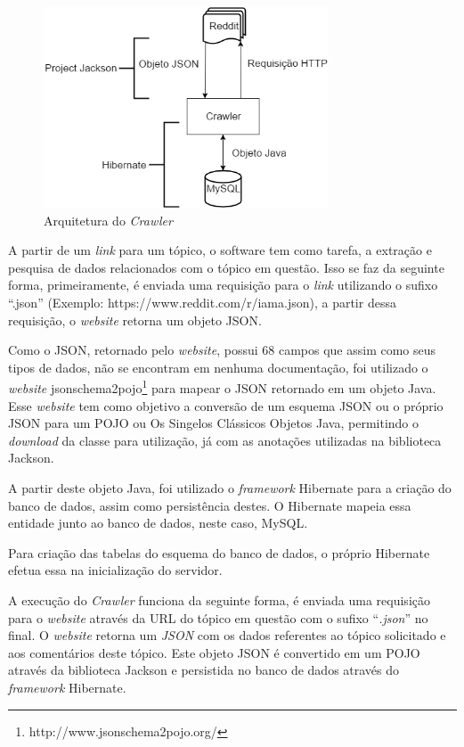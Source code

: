 \begin{figure}[htbp]
\centering
\includegraphics[height=225px]{imagens/arquitetura.png}
\caption{Arquitetura do \textit{Crawler}}
\label{fig:crawler}
\end{figure}

A partir de um \textit{link} para um tópico, o software tem como tarefa, a
extração e pesquisa de dados relacionados com o tópico em questão. Isso se faz
da seguinte forma, primeiramente, é enviada uma requisição para o \textit{link}
utilizando o sufixo ``.json'' (Exemplo: https://www.reddit.com/r/iama.json), a
partir dessa requisição, o \textit{website} retorna um objeto \ac{JSON}.

Como o \ac{JSON}, retornado pelo \textit{website}, possui 68 campos que assim
como seus tipos de dados, não se encontram em nenhuma documentação, foi utilizado o \textit{website}
jsonschema2pojo\footnote{http://www.jsonschema2pojo.org/} para mapear o \ac{JSON} retornado em um
objeto Java. Esse \textit{website} tem como objetivo a conversão de um esquema \ac{JSON} ou o próprio \ac{JSON} para um \ac{POJO} ou Os Singelos Clássicos Objetos Java, permitindo
o \textit{download} da classe para utilização, já com as anotações utilizadas na
biblioteca Jackson.

A partir deste objeto Java, foi utilizado o \textit{framework} Hibernate para a
criação do banco de dados, assim como persistência destes. O Hibernate mapeia essa
entidade junto ao banco de dados, neste caso, MySQL.

Para criação das tabelas do esquema do banco de dados, o próprio Hibernate
efetua essa na inicialização do servidor.

A execução do \textit{Crawler} funciona da seguinte forma, é enviada
uma requisição para o \textit{website} através da URL do tópico em questão com o
sufixo ``\textit{.json}'' no final. O \textit{website} retorna um
\textit{JSON} com os dados referentes ao tópico solicitado e aos comentários
deste tópico. Este objeto \ac{JSON} é convertido em um \ac{POJO} através da
biblioteca Jackson e persistida no banco de dados através do \textit{framework}
Hibernate.

